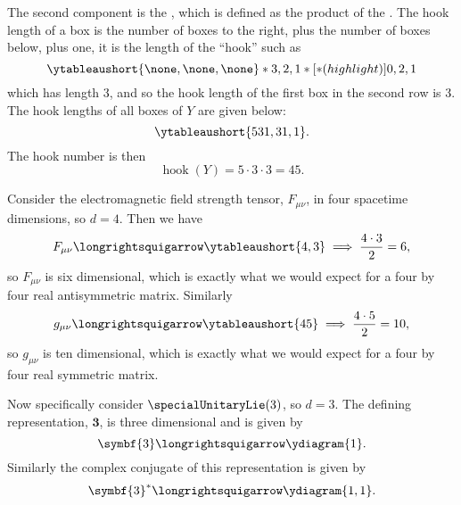 \documentclass[fleqn]{NotesClass}
\newcommand{\rep}[1]{\symbf{#1}}
\DeclareMathOperator{\hook}{hook}
\begin{document}
    The second component is the , which is defined as the product of the .
    The hook length of a box is the number of boxes to the right, plus the number of boxes below, plus one, it is the length of the \enquote{hook} such as
    \begin{equation}
        \ytableaushort{\none,\none,\none}*{3,2,1}*[*(highlight)]{0,2,1}
    \end{equation}
    which has length 3, and so the hook length of the first box in the second row is 3.
    The hook lengths of all boxes of \(Y\) are given below:
    \begin{equation}
        \ytableaushort{531,31,1}.
    \end{equation}
    The hook number is then
    \begin{equation}
        \hook(Y) = 5\cdot 3 \cdot 3 = 45.
    \end{equation}
    
    Consider the electromagnetic field strength tensor, \(F_{\mu\nu}\), in four spacetime dimensions, so \(d = 4\).
    Then we have
    \begin{equation}
        F_{\mu\nu} \longrightsquigarrow \ytableaushort{4,3} \implies \frac{4\cdot 3}{2} = 6,
    \end{equation}
    so \(F_{\mu\nu}\) is six dimensional, which is exactly what we would expect for a four by four real antisymmetric matrix.
    Similarly
    \begin{equation}
        g_{\mu\nu} \longrightsquigarrow \ytableaushort{45} \implies \frac{4 \cdot 5}{2} = 10,
    \end{equation}
    so \(g_{\mu\nu}\) is ten dimensional, which is exactly what we would expect for a four by four real symmetric matrix.
    
    Now specifically consider \(\specialUnitaryLie(3)\), so \(d = 3\).
    The defining representation, \(\rep{3}\), is three dimensional and is given by
    \begin{equation}
        \rep{3} \longrightsquigarrow \ydiagram{1}.
    \end{equation}
    Similarly the complex conjugate of this representation is given by
    \begin{equation}
        \rep{3}^* \longrightsquigarrow \ydiagram{1,1}.
    \end{equation}
    
\end{document}
